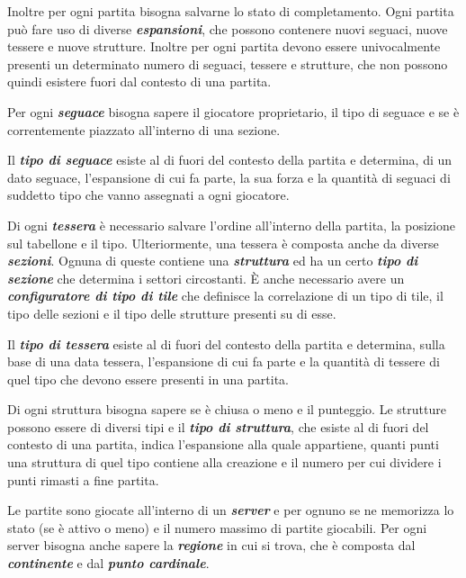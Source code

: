 Inoltre per ogni partita bisogna salvarne lo stato di completamento. Ogni partita può fare uso di diverse \textbf{\emph{espansioni}}, che possono contenere nuovi seguaci, nuove tessere e nuove strutture. Inoltre per ogni partita devono essere univocalmente presenti un determinato numero di seguaci, tessere e strutture, che non possono quindi esistere fuori dal contesto di una partita.
\medskip

Per ogni \textbf{\emph{seguace}} bisogna sapere il giocatore proprietario, il tipo di seguace e se è correntemente piazzato all'interno di una sezione.
\medskip

Il \textbf{\emph{tipo di seguace}} esiste al di fuori del contesto della partita e determina, di un dato seguace, l'espansione di cui fa parte, la sua forza e la quantità di seguaci di suddetto tipo che vanno assegnati a ogni giocatore.
\medskip

Di ogni \textbf{\emph{tessera}} è necessario salvare l'ordine all'interno della partita, la posizione sul tabellone e il tipo. Ulteriormente, una tessera è composta anche da diverse \textbf{\emph{sezioni}}. Ognuna di queste contiene una \textbf{\emph{struttura}} ed ha un certo \textbf{\emph{tipo di sezione}} che determina i settori circostanti. È anche necessario avere un \textbf{\emph{configuratore di tipo di tile}} che definisce la correlazione di un tipo di tile, il tipo delle sezioni e il tipo delle strutture presenti su di esse.
\medskip

Il \textbf{\emph{tipo di tessera}} esiste al di fuori del contesto della partita e determina, sulla base di una data tessera, l'espansione di cui fa parte e la quantità di tessere di quel tipo che devono essere presenti in una partita.
\medskip

Di ogni struttura bisogna sapere se è chiusa o meno e il punteggio. Le strutture possono essere di diversi tipi e il \textbf{\emph{tipo di struttura}}, che esiste al di fuori del contesto di una partita, indica l'espansione alla quale appartiene, quanti punti una struttura di quel tipo contiene alla creazione e il numero per cui dividere i punti rimasti a fine partita.
\medskip

Le partite sono giocate all'interno di un \textbf{\emph{server}} e per ognuno se ne memorizza lo stato (se è attivo o meno) e il numero massimo di partite giocabili. Per ogni server bisogna anche sapere la \textbf{\emph{regione}} in cui si trova, che è composta dal \textbf{\emph{continente}} e dal \textbf{\emph{punto cardinale}}.
\medskip


